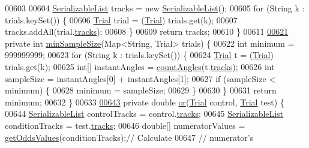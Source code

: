 \begin{DoxyCode}
{00603 
00604     \hyperlink{classdata_1_1_serializable_list}{SerializableList} tracks = \textcolor{keyword}{new} \hyperlink{classdata_1_1_serializable_list}{SerializableList}();
00605     \textcolor{keywordflow}{for} (String k : trials.keySet()) \{
00606       \hyperlink{classdata_1_1_trial}{Trial} trial = (\hyperlink{classdata_1_1_trial}{Trial}) trials.get(k);
00607       tracks.addAll(trial.\hyperlink{classdata_1_1_trial_ab0c3156759c41236f7f0bc83e1e5ef8f}{tracks});
00608     \}
00609     \textcolor{keywordflow}{return} tracks;
00610   \}
00611 
\hypertarget{_chemotaxis_8java_source_l00621}{}\hyperlink{classanalysis_1_1_chemotaxis_a3ae63569c841ffc6aa09be276f526c03}{00621}   \textcolor{keyword}{private} \textcolor{keywordtype}{int} \hyperlink{classanalysis_1_1_chemotaxis_a3ae63569c841ffc6aa09be276f526c03}{minSampleSize}(Map<String, Trial> trials) \{
00622     \textcolor{keywordtype}{int} minimum = 999999999;
00623     \textcolor{keywordflow}{for} (String k : trials.keySet()) \{
00624       \hyperlink{classdata_1_1_trial}{Trial} t = (\hyperlink{classdata_1_1_trial}{Trial}) trials.get(k);
00625       \textcolor{keywordtype}{int}[] instantAngles = \hyperlink{classanalysis_1_1_chemotaxis_a55deae924cf7ec2004a8fdcd8e185f94}{countAngles}(t.\hyperlink{classdata_1_1_trial_ab0c3156759c41236f7f0bc83e1e5ef8f}{tracks});
00626       \textcolor{keywordtype}{int} sampleSize = instantAngles[0] + instantAngles[1];
00627       \textcolor{keywordflow}{if} (sampleSize < minimum) \{
00628         minimum = sampleSize;
00629       \}
00630     \}
00631     \textcolor{keywordflow}{return} minimum;
00632   \}
00633 
\hypertarget{_chemotaxis_8java_source_l00643}{}\hyperlink{classanalysis_1_1_chemotaxis_a4cf45f4c73ebe44a71a622c690f0b331}{00643}   \textcolor{keyword}{private} \textcolor{keywordtype}{double} \hyperlink{classanalysis_1_1_chemotaxis_a4cf45f4c73ebe44a71a622c690f0b331}{or}(\hyperlink{classdata_1_1_trial}{Trial} control, \hyperlink{classdata_1_1_trial}{Trial} test) \{
00644     \hyperlink{classdata_1_1_serializable_list}{SerializableList} controlTracks = control.\hyperlink{classdata_1_1_trial_ab0c3156759c41236f7f0bc83e1e5ef8f}{tracks};
00645     \hyperlink{classdata_1_1_serializable_list}{SerializableList} conditionTracks = test.\hyperlink{classdata_1_1_trial_ab0c3156759c41236f7f0bc83e1e5ef8f}{tracks};
00646     \textcolor{keywordtype}{double}[] numeratorValues = \hyperlink{classanalysis_1_1_chemotaxis_a02c2fbfd2097bca3933e285e6712a58d}{getOddsValues}(conditionTracks);\textcolor{comment}{// Calculate}
00647                                                               \textcolor{comment}{// numerator's}
}
\end{DoxyCode}
